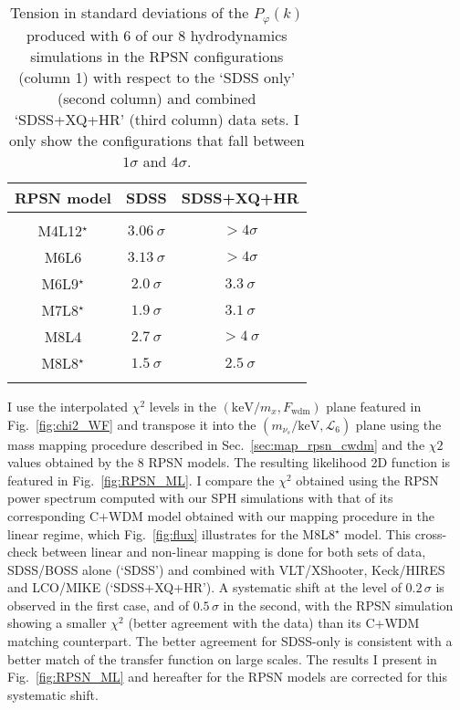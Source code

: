 \begin{table*}
	\begin{center}
		\begin{tabular}{ccc}
			\textbf{RPSN model} & \textbf{SDSS} & \textbf{SDSS+XQ+HR}\\[2pt]
			\hline \\[-10pt]
			M4L12$^\star$ & $3.06 ~\sigma$ & $ >4\sigma$\\[2pt]
			M6L6 & $3.13 ~\sigma$ & $ >4\sigma$\\[2pt]
			M6L9$^\star$ & $2.0 ~\sigma$ & $3.3 ~\sigma$\\[2pt]
			M7L8$^\star$ & $1.9 ~\sigma$ & $3.1 ~\sigma$\\[2pt]
			M8L4 & $2.7 ~\sigma$ & $> 4 ~\sigma$\\[2pt]
			M8L8$^\star$ & $1.5 ~\sigma$ & $2.5 ~\sigma$\\[2pt]
			\hline \\[-10pt]
		\end{tabular}
	\end{center}
	\caption{Tension in standard deviations of the $P_{\varphi}(k)$ produced with 6 of our 8 hydrodynamics simulations in the RPSN configurations (column 1) with respect to the `SDSS only' (second column) and combined `SDSS+XQ+HR' (third column) data sets. I only show the configurations that fall between $1\sigma$ and $4\sigma$. }
	\label{tab:RPSNsigma}
\end{table*}


I use the interpolated $\chi^2$ levels in the $\left( \mathrm{keV}/m_x, F_{\mathrm{wdm}} \right)$ plane featured in Fig.~\ref{fig:chi2_WF} and transpose it into the $\left( m_{\nu_s}/\mathrm{keV}, \mathcal{L}_6 \right)$ plane using the mass mapping procedure described in Sec.~\ref{sec:map_rpsn_cwdm} and the $\chi2$ values obtained by the 8 RPSN models. The resulting likelihood 2D function is featured in Fig.~\ref{fig:RPSN_ML}. I compare the $\chi^2$ obtained 
using the RPSN power spectrum computed with our SPH simulations with that of its corresponding C+WDM model obtained with our mapping procedure in the linear regime, which Fig.~\ref{fig:flux} illustrates for the M8L8$^{\star}$ model. This cross-check between linear and non-linear mapping is done for both sets of data, SDSS/BOSS alone (`SDSS') and combined with VLT/XShooter, Keck/HIRES and LCO/MIKE (`SDSS+XQ+HR'). A systematic shift at the level of $0.2\,\sigma$ is observed in the first case, and of $0.5\,\sigma$ in the second, with the RPSN simulation showing a smaller $\chi^2$ (better agreement with the data) than its C+WDM matching counterpart. The better agreement for SDSS-only is consistent with a better match of the transfer function on large scales. The results I present in Fig.~\ref{fig:RPSN_ML} and hereafter for the RPSN models are corrected for this systematic shift. \\


